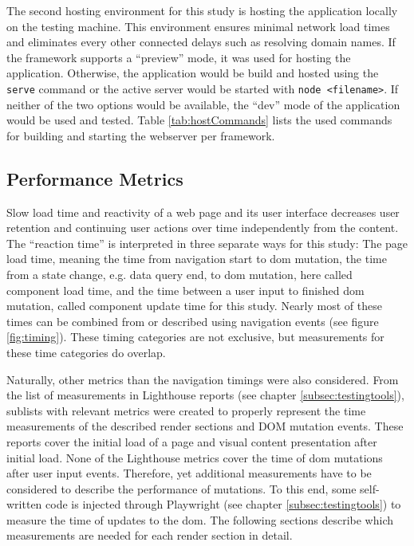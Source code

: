 \documentclass[a4paper, 12pt]{article}
\begin{document}
The second hosting environment for this study is hosting the application locally on the testing machine.
This environment ensures minimal network load times and eliminates every other connected delays such as resolving domain names.
If the framework supports a \enquote{preview} mode, it was used for hosting the application.
Otherwise, the application would be build and hosted using the \verb|serve| command or the active server would be started with \verb|node <filename>|.
If neither of the two options would be available, the \enquote{dev} mode of the application would be used and tested.
Table \ref{tab:hostCommands} lists the used commands for building and starting the webserver per framework.

\subsection{Performance Metrics}\label{subsec:performancemetrics}
% 

Slow load time and reactivity of a web page and its user interface decreases user retention and continuing user actions over time independently from the content. %
The \enquote{reaction time} is interpreted in three separate ways for this study: The page load time, meaning the time from navigation start to \acrshort{dom} mutation, the time from a state change, e.g. data query end, to \acrshort{dom} mutation, here called component load time, and the time between a user input to finished \acrshort{dom} mutation, called component update time for this study.
Nearly most of these times can be combined from or described using navigation events (see figure \ref{fig:timing}).
These timing categories are not exclusive, but measurements for these time categories do overlap.

Naturally, other metrics than the navigation timings were also considered.
From the list of measurements in Lighthouse reports (see chapter \ref{subsec:testingtools}), sublists with relevant metrics were created to properly represent the time measurements of the described render sections and DOM mutation events.
These reports cover the initial load of a page and visual content presentation after initial load.
None of the Lighthouse metrics cover the time of \acrshort{dom} mutations after user input events.
Therefore, yet additional measurements have to be considered to describe the performance of mutations.
To this end, some self-written code is injected through Playwright (see chapter \ref{subsec:testingtools}) to measure the time of updates to the \acrshort{dom}.
The following sections describe which measurements are needed for each render section in detail.
\end{document}
